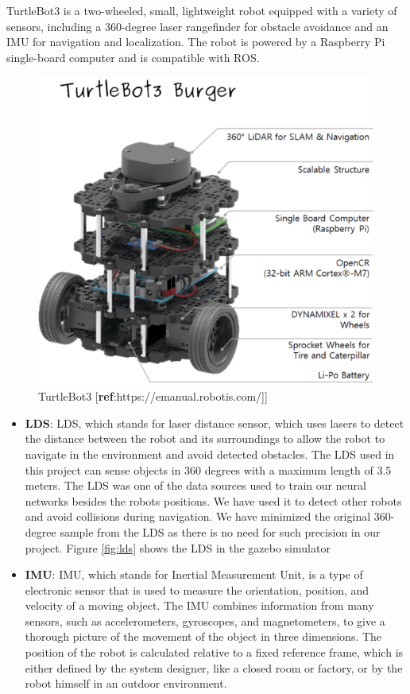 \documentclass[12pt]{extarticle}
\begin{document}
TurtleBot3 is a two-wheeled, small, lightweight robot equipped with a variety of sensors, including a 360-degree laser rangefinder for obstacle avoidance and an IMU for navigation and localization. The robot is powered by a Raspberry Pi single-board computer and is compatible with ROS.
 \begin{figure}[h]  
\centering
\includegraphics[scale=0.4]{turtlebot3_burger_components.png}
\caption[TurtleBot3]{TurtleBot3 [\textbf{ref}:https://emanual.robotis.com/]]}
\end{figure}

\begin{itemize}
\item \textbf{LDS}:  LDS, which stands for laser distance sensor, which uses lasers to detect the distance between the robot and its surroundings to allow the robot to navigate in the environment and avoid detected obstacles. The LDS used in this project can sense objects in 360 degrees with a maximum length of 3.5 meters. The LDS was one of the data sources used to train our neural networks besides the robots positions. We have used it to detect other robots and avoid collisions during navigation. We have minimized the original 360-degree sample from the LDS as there is no need for such precision in our project. Figure \ref{fig:lds} shows the LDS in the gazebo simulator
     
\item \textbf{IMU}: IMU, which stands for Inertial Measurement Unit, is a type of electronic sensor that is used to measure the orientation, position, and velocity of a moving object. The IMU combines information from many sensors, such as accelerometers, gyroscopes, and magnetometers, to give a thorough picture of the movement of the object in three dimensions. The position of the robot is calculated relative to a fixed reference frame, which is either defined by the system designer, like a closed room or factory, or by the robot himself in an outdoor environment.






\end{itemize}
\end{document}
